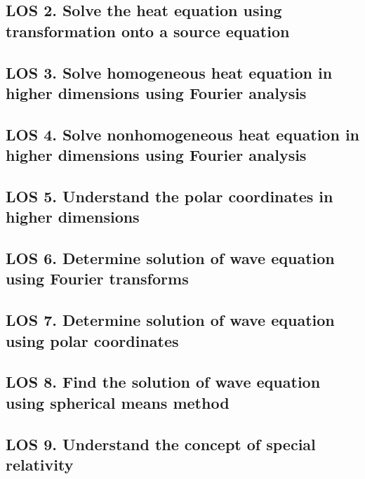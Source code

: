 \documentclass[12pt, a4paper]{article}
\begin{document}
\subsection*{LOS 2. Solve the heat equation using transformation onto a source equation}
\vspace{0.3em}

\subsection*{LOS 3. Solve homogeneous heat equation in higher dimensions using Fourier analysis}
\vspace{0.3em}

\subsection*{LOS 4. Solve nonhomogeneous heat equation in higher dimensions using Fourier analysis}
\vspace{0.3em}

\subsection*{LOS 5. Understand the polar coordinates in higher dimensions}
\vspace{0.3em}

\subsection*{LOS 6. Determine solution of wave equation using Fourier transforms}
\vspace{0.3em}

\subsection*{LOS 7. Determine solution of wave equation using polar coordinates}
\vspace{0.3em}

\subsection*{LOS 8. Find the solution of wave equation using spherical means method}
\vspace{0.3em}

\subsection*{LOS 9. Understand the concept of special relativity}
\vspace{0.3em}
\end{document}
